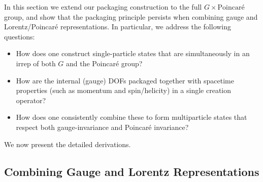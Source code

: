 \documentclass[12pt,a4paper]{article}
\begin{document}
In this section we extend our packaging construction to the full
$G \times \mathrm{Poincaré}$ group, and show that the packaging principle persists when combining gauge and Lorentz/Poincaré representations.
In particular, we address the following questions:
\begin{itemize}
	\item How does one construct single-particle states that are simultaneously in an irrep of both $G$ and the Poincaré group?
	
	\item How are the internal (gauge) DOFs packaged together with spacetime properties (such as momentum and spin/helicity) in a single creation operator?
	
	\item How does one consistently combine these to form multiparticle states that respect both gauge-invariance and Poincaré invariance?
\end{itemize}

We now present the detailed derivations.



\subsection{Combining Gauge and Lorentz Representations}
\end{document}
